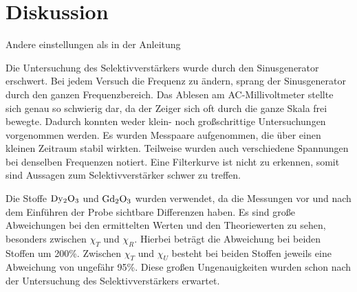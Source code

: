 \section{Diskussion}
\label{sec:Diskussion}

Andere einstellungen als in der Anleitung

Die Untersuchung des Selektivverstärkers wurde durch den Sinusgenerator erschwert.
Bei jedem Versuch die Frequenz zu ändern, sprang der Sinusgenerator durch den ganzen Frequenzbereich.
Das Ablesen am AC-Millivoltmeter stellte sich genau so schwierig dar, da der Zeiger sich oft durch die ganze Skala frei bewegte.
Dadurch konnten weder klein- noch großschrittige Untersuchungen vorgenommen werden.
Es wurden Messpaare aufgenommen, die über einen kleinen Zeitraum stabil wirkten.
Teilweise wurden auch verschiedene Spannungen bei denselben Frequenzen notiert.
Eine Filterkurve ist nicht zu erkennen, somit sind Aussagen zum Selektivverstärker schwer zu treffen.

Die Stoffe $\ce{Dy2O3}$ und $\ce{Gd2O3}$ wurden verwendet, da die Messungen vor und nach dem Einführen der Probe sichtbare Differenzen haben.
Es sind große Abweichungen bei den ermittelten Werten und den Theoriewerten zu sehen, besonders zwischen $\chi_T$ und $\chi_R$.
Hierbei beträgt die Abweichung bei beiden Stoffen um 200\%.
Zwischen $\chi_T$ und $\chi_U$ besteht bei beiden Stoffen jeweils eine Abweichung von ungefähr 95\%.
Diese großen Ungenauigkeiten wurden schon nach der Untersuchung des Selektivverstärkers erwartet.

